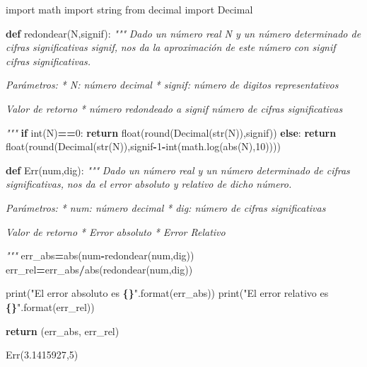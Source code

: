 \documentclass[
]{article}
\newenvironment{Shaded}{\begin{snugshade}}{\end{snugshade}}
\newcommand{\BuiltInTok}[1]{#1}
\newcommand{\CommentTok}[1]{\textcolor[rgb]{0.56,0.35,0.01}{\textit{#1}}}
\newcommand{\ControlFlowTok}[1]{\textcolor[rgb]{0.13,0.29,0.53}{\textbf{#1}}}
\newcommand{\DecValTok}[1]{\textcolor[rgb]{0.00,0.00,0.81}{#1}}
\newcommand{\FloatTok}[1]{\textcolor[rgb]{0.00,0.00,0.81}{#1}}
\newcommand{\ImportTok}[1]{#1}
\newcommand{\KeywordTok}[1]{\textcolor[rgb]{0.13,0.29,0.53}{\textbf{#1}}}
\newcommand{\NormalTok}[1]{#1}
\newcommand{\OperatorTok}[1]{\textcolor[rgb]{0.81,0.36,0.00}{\textbf{#1}}}
\newcommand{\SpecialCharTok}[1]{\textcolor[rgb]{0.81,0.36,0.00}{\textbf{#1}}}
\newcommand{\StringTok}[1]{\textcolor[rgb]{0.31,0.60,0.02}{#1}}
\begin{document}
\begin{Shaded}
\begin{Highlighting}[]
\ImportTok{import}\NormalTok{ math}
\ImportTok{import}\NormalTok{ string}
\ImportTok{from}\NormalTok{ decimal }\ImportTok{import}\NormalTok{ Decimal}

\KeywordTok{def}\NormalTok{ redondear(N,signif):}
  \CommentTok{"""}
\CommentTok{      Dado un número real N y un número determinado de cifras significativas signif,}
\CommentTok{      nos da la aproximación de este número con signif cifras significativas.}

\CommentTok{        Parámetros:}
\CommentTok{        * N: número decimal}
\CommentTok{        * signif: número de digitos representativos}

\CommentTok{        Valor de retorno}
\CommentTok{        * número redondeado a signif número de cifras significativas}

\CommentTok{   """}
  \ControlFlowTok{if} \BuiltInTok{int}\NormalTok{(N)}\OperatorTok{==}\DecValTok{0}\NormalTok{:}
    \ControlFlowTok{return} \BuiltInTok{float}\NormalTok{(}\BuiltInTok{round}\NormalTok{(Decimal(}\BuiltInTok{str}\NormalTok{(N)),signif))}
  \ControlFlowTok{else}\NormalTok{:}
    \ControlFlowTok{return} \BuiltInTok{float}\NormalTok{(}\BuiltInTok{round}\NormalTok{(Decimal(}\BuiltInTok{str}\NormalTok{(N)),signif}\OperatorTok{{-}}\DecValTok{1}\OperatorTok{{-}}\BuiltInTok{int}\NormalTok{(math.log(}\BuiltInTok{abs}\NormalTok{(N),}\DecValTok{10}\NormalTok{))))}
  
\KeywordTok{def}\NormalTok{ Err(num,dig):}
    \CommentTok{"""}
\CommentTok{      Dado un número real y un número determinado de cifras significativas,}
\CommentTok{      nos da el error absoluto y relativo de dicho número.}

\CommentTok{        Parámetros:}
\CommentTok{        * num: número decimal}
\CommentTok{        * dig: número de cifras significativas}

\CommentTok{        Valor de retorno}
\CommentTok{        * Error absoluto}
\CommentTok{        * Error Relativo}

\CommentTok{    """}
\NormalTok{    err\_abs}\OperatorTok{=}\BuiltInTok{abs}\NormalTok{(num}\OperatorTok{{-}}\NormalTok{redondear(num,dig))}
\NormalTok{    err\_rel}\OperatorTok{=}\NormalTok{err\_abs}\OperatorTok{/}\BuiltInTok{abs}\NormalTok{(redondear(num,dig))}

    \BuiltInTok{print}\NormalTok{(}\StringTok{"El error absoluto es }\SpecialCharTok{\{\}}\StringTok{"}\NormalTok{.}\BuiltInTok{format}\NormalTok{(err\_abs))}
    \BuiltInTok{print}\NormalTok{(}\StringTok{"El error relativo es }\SpecialCharTok{\{\}}\StringTok{"}\NormalTok{.}\BuiltInTok{format}\NormalTok{(err\_rel))}

    \ControlFlowTok{return}\NormalTok{ (err\_abs, err\_rel)}

\NormalTok{Err(}\FloatTok{3.1415927}\NormalTok{,}\DecValTok{5}\NormalTok{)}
\end{Highlighting}
\end{Shaded}
\end{document}
